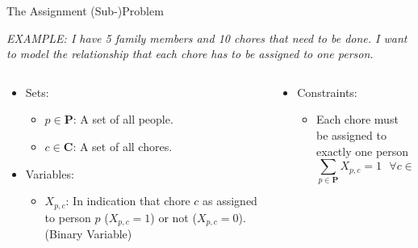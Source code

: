 \documentclass[10pt, aspectratio=169]{beamer}
\begin{document}
\begin{frame}{The Assignment (Sub-)Problem}
    \begin{center}
        \textit{EXAMPLE: I have 5 family members and 10 chores that need to be done. I want to model the relationship that each chore has to be assigned to one person.}
    \end{center}
    \begin{columns}
        \begin{column}{0.5\textwidth}
            \begin{itemize}
                \item Sets:
                \begin{itemize}
                    \item $p \in \textbf{P}$: A set of all people.
                    \item $c \in \textbf{C}$: A set of all chores.
                \end{itemize}
                \item Variables:
                \begin{itemize}
                    \item $X_{p,c}$: In indication that chore $c$ as assigned to person $p$ ($X_{p,c} = 1$) or not ($X_{p,c} = 0$). (Binary Variable)
                \end{itemize}
            \end{itemize}
        \end{column}
        \begin{column}{0.5\textwidth}
            \begin{itemize}
                \item Constraints:
                \begin{itemize}
                    \item Each chore must be assigned to exactly one person
                    $$\sum_{p \in \textbf{P}} X_{p,c} = 1 \ \ \ \forall c \in \textbf{C}$$
                \end{itemize}
            \end{itemize}
        \end{column}
    \end{columns}
\end{frame}
\end{document}
